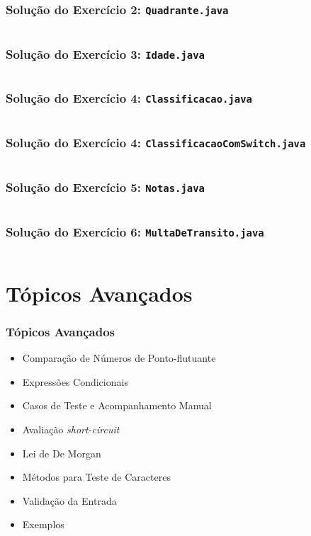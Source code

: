 \documentclass[xcolor={dvipsnames,table},aspectratio=169]{beamer}
\begin{document}
\begin{frame}[fragile]\frametitle{Solução do Exercício 2: \texttt{Quadrante.java}}
	\tiny{\inputminted[bgcolor=cyan!10]{java}{src/Quadrante.java}}
\end{frame}

\begin{frame}[fragile]\frametitle{Solução do Exercício 3: \texttt{Idade.java}}
	\tiny{\inputminted[bgcolor=cyan!10]{java}{src/Idade.java}}
\end{frame}

\begin{frame}[fragile]\frametitle{Solução do Exercício 4: \texttt{Classificacao.java}}
	\tiny{\inputminted[bgcolor=cyan!10]{java}{src/Classificacao.java}}
\end{frame}

\begin{frame}[fragile]\frametitle{Solução do Exercício 4: \texttt{ClassificacaoComSwitch.java}}
	\tiny{\inputminted[bgcolor=cyan!10]{java}{src/ClassificacaoComSwitch.java}}
\end{frame}

\begin{frame}[fragile]\frametitle{Solução do Exercício 5: \texttt{Notas.java}}
	\scriptsize{\inputminted[bgcolor=cyan!10]{java}{src/Notas.java}}
\end{frame}

\begin{frame}[fragile]\frametitle{Solução do Exercício 6: \texttt{MultaDeTransito.java}}
	\tiny{\inputminted[bgcolor=cyan!10]{java}{src/MultaDeTransito.java}}
\end{frame}

\section{Tópicos Avançados}

\begin{frame}[fragile]\frametitle{Tópicos Avançados}
\begin{itemize}
	\item Comparação de Números de Ponto-flutuante
	\item Expressões Condicionais
	\item Casos de Teste e Acompanhamento Manual
	\item Avaliação \emph{short-circuit}
	\item Lei de De Morgan
	\item Métodos para Teste de Caracteres
	\item Validação da Entrada
	\item Exemplos
\end{itemize}
\end{frame}
\end{document}
